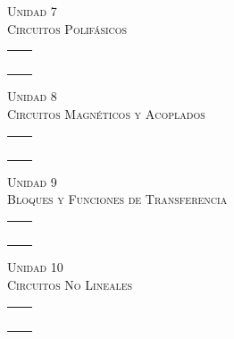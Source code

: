 \documentclass[11pt,a4paper,twocolumn]{article}
\newcommand{\unidad}[2]{\begin{center}
		\fontsize{10}{10}\selectfont\color{gray!50!black}\scshape Unidad #1 \\
		\fontsize{14}{14}\selectfont \scshape #2
\end{center}}
\begin{document}
	\unidad{7}{Circuitos Polifásicos}
	
	
	\begin{tabular}{r | l} \vspace{.2cm}
		& \\ \vspace{.2cm}
		& \\ \vspace{.2cm}
		& \\ \vspace{.2cm}
		& \\ \vspace{.2cm}
		& \\ 
		
	\end{tabular}
	
	\unidad{8}{Circuitos Magnéticos y Acoplados}
	
	
	\begin{tabular}{r | l} \vspace{.2cm}
		& \\ \vspace{.2cm}
		& \\ \vspace{.2cm}
		& \\ \vspace{.2cm}
		& \\ \vspace{.2cm}
		& \\ 
		
	\end{tabular}
	
	\unidad{9}{Bloques y Funciones de Transferencia}
	
	
	\begin{tabular}{r | l} \vspace{.2cm}
		& \\ \vspace{.2cm}
		& \\ \vspace{.2cm}
		& \\ \vspace{.2cm}
		& \\ \vspace{.2cm}
		& \\ 
		
	\end{tabular}
	
	\unidad{10}{Circuitos No Lineales}
	
	
	\begin{tabular}{r | l} \vspace{.2cm}
		& \\ \vspace{.2cm}
		& \\ \vspace{.2cm}
		& \\ \vspace{.2cm}
		& \\ \vspace{.2cm}
		& \\ 
		
	\end{tabular}
	
\end{document}
